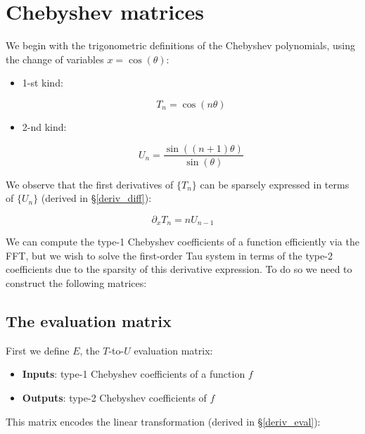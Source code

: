 \documentclass{article}
\begin{document}
\section{Chebyshev matrices}

We begin with the trigonometric definitions of the Chebyshev polynomials, using the change of variables $x = \cos(\theta)$:

\begin{itemize}
    \item 1-st kind:
    
    \begin{equation}
    T_n = \cos(n \theta)
    \end{equation}
    
    \item 2-nd kind:
    
    \begin{equation}
    U_n = \frac{\sin((n+1) \theta)}{\sin(\theta)}
    \end{equation}
\end{itemize}

We observe that the first derivatives of $\{T_n\}$ can be sparsely expressed in terms of $\{U_n\}$ (derived in \S \ref{deriv_diff}):

\begin{equation}
\partial_x T_n = n U_{n-1}
\end{equation}

We can compute the type-1 Chebyshev coefficients of a function efficiently via the FFT, but we wish to solve the first-order Tau system in terms of the type-2 coefficients due to the sparsity of this derivative expression.  To do so we need to construct the following matrices:

\subsection{The evaluation matrix}

First we define $E$, the $T$-to-$U$ evaluation matrix:

\begin{itemize}
    \item \textbf{Inputs}: type-1 Chebyshev coefficients of a function $f$
    \item \textbf{Outputs}: type-2 Chebyshev coefficients of $f$
\end{itemize}

This matrix encodes the linear transformation (derived in \S \ref{deriv_eval}):
\end{document}
